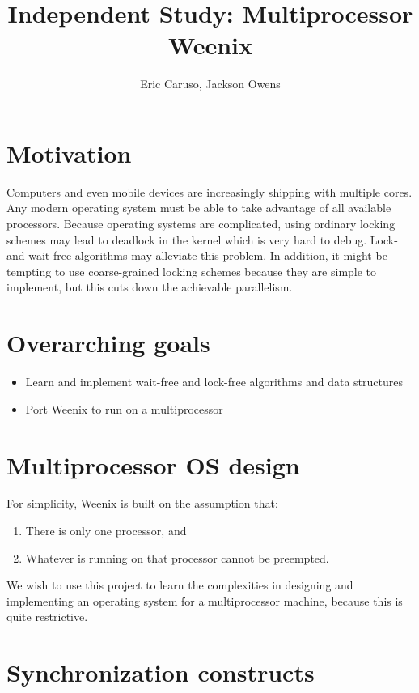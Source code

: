 \documentclass{article}
\begin{document}
\title{Independent Study: Multiprocessor Weenix}
\author{Eric Caruso, Jackson Owens}
\maketitle

\section{Motivation}

Computers and even mobile devices are increasingly shipping with multiple cores. Any modern
operating system must be able to take advantage of all available processors. Because operating
systems are complicated, using ordinary locking schemes may lead to deadlock in the kernel which
is very hard to debug. Lock- and wait-free algorithms may alleviate this problem. In addition,
it might be tempting to use coarse-grained locking schemes because they are simple to implement,
but this cuts down the achievable parallelism.

\section{Overarching goals}

\begin{itemize}
    \item Learn and implement wait-free and lock-free algorithms and data structures
    \item Port Weenix to run on a multiprocessor
\end{itemize}

\section{Multiprocessor OS design}

For simplicity, Weenix is built on the assumption that:
\begin{enumerate}
    \item There is only one processor, and
    \item Whatever is running on that processor cannot be preempted.
\end{enumerate}

We wish to use this project to learn the complexities in designing and implementing
an operating system for a multiprocessor machine, because this is quite restrictive.

\section{Synchronization constructs}
\end{document}
